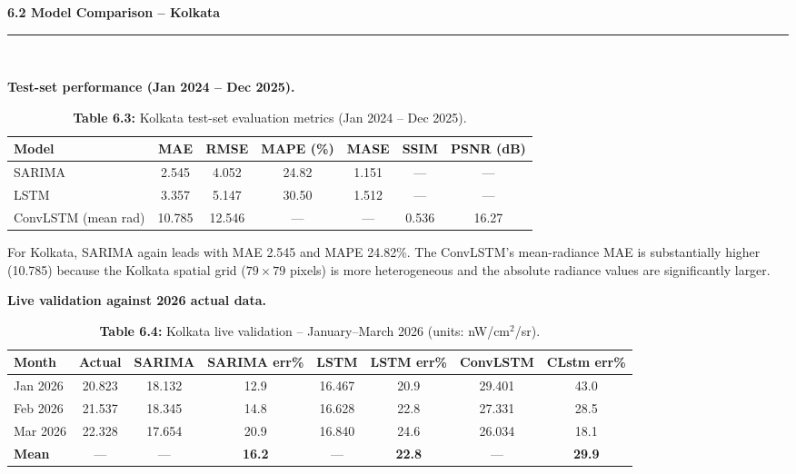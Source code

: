 \documentclass[12pt,a4paper]{report}
\begin{document}
\vspace{0.5cm}
\begin{center}
    \hypertarget{sec:s62}{}%
    {\large \textbf{6.2 Model Comparison -- Kolkata}}\\[0.3cm]
    \noindent\rule{\linewidth}{0.4pt}\\[0.5cm]
\end{center}

\textbf{Test-set performance (Jan 2024 -- Dec 2025).}

\begin{table}[H]
\centering
\caption*{\textbf{Table 6.3:} Kolkata test-set evaluation metrics (Jan 2024 -- Dec 2025).}
\begin{tabular}{lcccccc}
\toprule
\textbf{Model} & \textbf{MAE} & \textbf{RMSE} & \textbf{MAPE (\%)} & \textbf{MASE} & \textbf{SSIM} & \textbf{PSNR (dB)} \\
\midrule
SARIMA & 2.545 & 4.052 & 24.82 & 1.151 & --- & --- \\
LSTM   & 3.357 & 5.147 & 30.50 & 1.512 & --- & --- \\
ConvLSTM (mean rad) & 10.785 & 12.546 & --- & --- & 0.536 & 16.27 \\
\bottomrule
\end{tabular}
\end{table}

For Kolkata, SARIMA again leads with MAE 2.545 and MAPE 24.82\%. The ConvLSTM's mean-radiance MAE is substantially higher (10.785) because the Kolkata spatial grid ($79 \times 79$ pixels) is more heterogeneous and the absolute radiance values are significantly larger.

\textbf{Live validation against 2026 actual data.}

\begin{table}[H]
\centering
\caption*{\textbf{Table 6.4:} Kolkata live validation -- January--March 2026 (units: nW/cm$^2$/sr).}
\begin{tabular}{lccccccc}
\toprule
\textbf{Month} & \textbf{Actual} & \textbf{SARIMA} & \textbf{SARIMA err\%} & \textbf{LSTM} & \textbf{LSTM err\%} & \textbf{ConvLSTM} & \textbf{CLstm err\%} \\
\midrule
Jan 2026 & 20.823 & 18.132 & 12.9 & 16.467 & 20.9 & 29.401 & 43.0 \\
Feb 2026 & 21.537 & 18.345 & 14.8 & 16.628 & 22.8 & 27.331 & 28.5 \\
Mar 2026 & 22.328 & 17.654 & 20.9 & 16.840 & 24.6 & 26.034 & 18.1 \\
\midrule
\textbf{Mean} & --- & --- & \textbf{16.2} & --- & \textbf{22.8} & --- & \textbf{29.9} \\
\bottomrule
\end{tabular}
\end{table}
\end{document}
